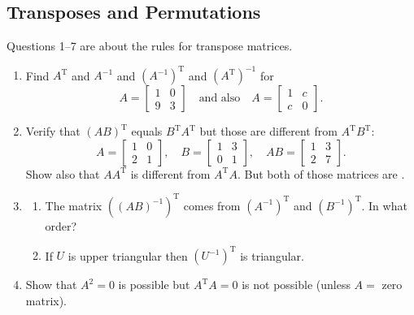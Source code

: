 \documentclass[14pt, a4paper]{article}
\begin{document}
\subsection{Transposes and Permutations}
\noindent Questions 1--7 are about the rules for transpose matrices.
\begin{enumerate}
    \item Find $A^{\mathrm{T}}$ and $A^{-1}$ and $(A^{-1})^{\mathrm{T}}$ and $(A^{\mathrm{T}})^{-1}$ for
          \[
              A = \begin{bmatrix}1 & 0 \\ 9 & 3\end{bmatrix} \quad\text{and also}\quad A = \begin{bmatrix}1 & c \\ c & 0\end{bmatrix}.
          \]

    \item Verify that $(AB)^{\mathrm{T}}$ equals $B^{\mathrm{T}}A^{\mathrm{T}}$ but those are different from $A^{\mathrm{T}}B^{\mathrm{T}}$:
          \[
              A = \begin{bmatrix}1 & 0 \\ 2 & 1\end{bmatrix},\quad B = \begin{bmatrix}1 & 3 \\ 0 & 1\end{bmatrix},\quad AB = \begin{bmatrix}1 & 3 \\ 2 & 7\end{bmatrix}.
          \]
          Show also that $AA^{\mathrm{T}}$ is different from $A^{\mathrm{T}}A$. But both of those matrices are \underline{\hspace{2cm}}.
    \item
          \begin{enumerate}
              \item The matrix $((AB)^{-1})^{\mathrm{T}}$ comes from $(A^{-1})^{\mathrm{T}}$ and $(B^{-1})^{\mathrm{T}}$. In what order?
              \item If $U$ is upper triangular then $(U^{-1})^{\mathrm{T}}$ is \underline{\hspace{2cm}} triangular.
          \end{enumerate}

    \item Show that $A^2 = 0$ is possible but $A^{\mathrm{T}}A = 0$ is not possible (unless $A =$ zero matrix).


\end{enumerate}
\end{document}
